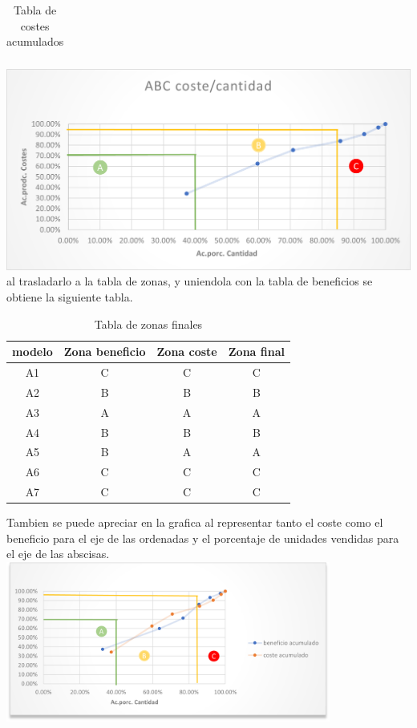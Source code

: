 \documentclass{report}
\begin{document}
\begin{raggedright}
\begin{table}[h]
\begin{tabular}{cccc}
		\bottomrule
	\end{tabular}
	\caption{Tabla de costes acumulados}
\end{table}
\newpage
\includegraphics{coste.png}\\
\vspace{1\baselineskip}
al trasladarlo a la tabla de zonas, y uniendola con la tabla de beneficios se obtiene la siguiente tabla.\\
\begin{table}[h]
	\centering
	\begin{tabular}{cccc}
		\toprule
		\textbf{modelo} & \textbf{Zona beneficio} & \textbf{Zona coste} & \textbf{Zona final} \\
		\midrule
		A1 & C & C & C \\
		A2 & B & B & B \\
		A3 & A & A & A \\
		A4 & B & B & B \\
		A5 & B & A & A \\
		A6 & C & C & C \\
		A7 & C & C & C \\
		\bottomrule
	\end{tabular}
	\caption{Tabla de zonas finales}
\end{table}
Tambien se puede apreciar en la grafica al representar tanto el coste como el beneficio para el eje de las ordenadas y el porcentaje de unidades vendidas para el eje de las abscisas.\\
\vspace{1\baselineskip}
\includegraphics[width=0.8\textwidth]{ABC.png}\\

\end{raggedright}
\end{document}
